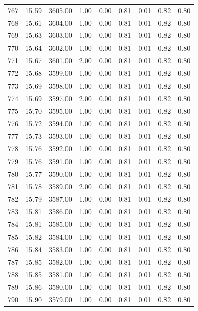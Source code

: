 \documentclass{article}\usepackage[]{graphicx}\usepackage[]{color}
\begin{document}
\begin{longtable}{rrrrrrrrr}
  767 & 15.59 & 3605.00 & 1.00 & 0.00 & 0.81 & 0.01 & 0.82 & 0.80 \\ 
  768 & 15.61 & 3604.00 & 1.00 & 0.00 & 0.81 & 0.01 & 0.82 & 0.80 \\ 
  769 & 15.63 & 3603.00 & 1.00 & 0.00 & 0.81 & 0.01 & 0.82 & 0.80 \\ 
  770 & 15.64 & 3602.00 & 1.00 & 0.00 & 0.81 & 0.01 & 0.82 & 0.80 \\ 
  771 & 15.67 & 3601.00 & 2.00 & 0.00 & 0.81 & 0.01 & 0.82 & 0.80 \\ 
  772 & 15.68 & 3599.00 & 1.00 & 0.00 & 0.81 & 0.01 & 0.82 & 0.80 \\ 
  773 & 15.69 & 3598.00 & 1.00 & 0.00 & 0.81 & 0.01 & 0.82 & 0.80 \\ 
  774 & 15.69 & 3597.00 & 2.00 & 0.00 & 0.81 & 0.01 & 0.82 & 0.80 \\ 
  775 & 15.70 & 3595.00 & 1.00 & 0.00 & 0.81 & 0.01 & 0.82 & 0.80 \\ 
  776 & 15.72 & 3594.00 & 1.00 & 0.00 & 0.81 & 0.01 & 0.82 & 0.80 \\ 
  777 & 15.73 & 3593.00 & 1.00 & 0.00 & 0.81 & 0.01 & 0.82 & 0.80 \\ 
  778 & 15.76 & 3592.00 & 1.00 & 0.00 & 0.81 & 0.01 & 0.82 & 0.80 \\ 
  779 & 15.76 & 3591.00 & 1.00 & 0.00 & 0.81 & 0.01 & 0.82 & 0.80 \\ 
  780 & 15.77 & 3590.00 & 1.00 & 0.00 & 0.81 & 0.01 & 0.82 & 0.80 \\ 
  781 & 15.78 & 3589.00 & 2.00 & 0.00 & 0.81 & 0.01 & 0.82 & 0.80 \\ 
  782 & 15.79 & 3587.00 & 1.00 & 0.00 & 0.81 & 0.01 & 0.82 & 0.80 \\ 
  783 & 15.81 & 3586.00 & 1.00 & 0.00 & 0.81 & 0.01 & 0.82 & 0.80 \\ 
  784 & 15.81 & 3585.00 & 1.00 & 0.00 & 0.81 & 0.01 & 0.82 & 0.80 \\ 
  785 & 15.82 & 3584.00 & 1.00 & 0.00 & 0.81 & 0.01 & 0.82 & 0.80 \\ 
  786 & 15.84 & 3583.00 & 1.00 & 0.00 & 0.81 & 0.01 & 0.82 & 0.80 \\ 
  787 & 15.85 & 3582.00 & 1.00 & 0.00 & 0.81 & 0.01 & 0.82 & 0.80 \\ 
  788 & 15.85 & 3581.00 & 1.00 & 0.00 & 0.81 & 0.01 & 0.82 & 0.80 \\ 
  789 & 15.86 & 3580.00 & 1.00 & 0.00 & 0.81 & 0.01 & 0.82 & 0.80 \\ 
  790 & 15.90 & 3579.00 & 1.00 & 0.00 & 0.81 & 0.01 & 0.82 & 0.80 \\ 

\end{longtable}
\end{document}
